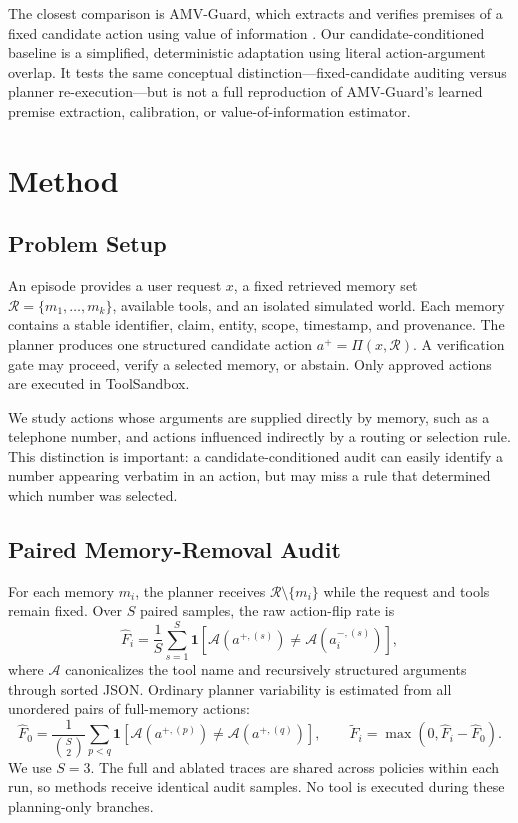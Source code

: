 \documentclass[11pt]{article}
\newcommand{\R}{\mathcal{R}}
\newcommand{\A}{\mathcal{A}}
\begin{document}
The closest comparison is AMV-Guard, which extracts and verifies premises of a fixed candidate action using value of information \cite{wang2026amv}. Our candidate-conditioned baseline is a simplified, deterministic adaptation using literal action-argument overlap. It tests the same conceptual distinction---fixed-candidate auditing versus planner re-execution---but is not a full reproduction of AMV-Guard's learned premise extraction, calibration, or value-of-information estimator.

\section{Method}

\subsection{Problem Setup}

An episode provides a user request $x$, a fixed retrieved memory set $\R=\{m_1,\ldots,m_k\}$, available tools, and an isolated simulated world. Each memory contains a stable identifier, claim, entity, scope, timestamp, and provenance. The planner produces one structured candidate action $a^{+}=\Pi(x,\R)$. A verification gate may proceed, verify a selected memory, or abstain. Only approved actions are executed in ToolSandbox.

We study actions whose arguments are supplied directly by memory, such as a telephone number, and actions influenced indirectly by a routing or selection rule. This distinction is important: a candidate-conditioned audit can easily identify a number appearing verbatim in an action, but may miss a rule that determined which number was selected.

\subsection{Paired Memory-Removal Audit}

For each memory $m_i$, the planner receives $\R\setminus\{m_i\}$ while the request and tools remain fixed. Over $S$ paired samples, the raw action-flip rate is
\begin{equation}
\widehat F_i=\frac{1}{S}\sum_{s=1}^{S}
\mathbf 1\!\left[\A(a^{+,(s)})\neq\A(a_i^{-,(s)})\right],
\end{equation}
where $\A$ canonicalizes the tool name and recursively structured arguments through sorted JSON. Ordinary planner variability is estimated from all unordered pairs of full-memory actions:
\begin{equation}
\widehat F_0=\frac{1}{\binom S2}\sum_{p<q}
\mathbf 1\!\left[\A(a^{+,(p)})\neq\A(a^{+,(q)})\right],
\qquad
\widetilde F_i=\max(0,\widehat F_i-\widehat F_0).
\end{equation}
We use $S=3$. The full and ablated traces are shared across policies within each run, so methods receive identical audit samples. No tool is executed during these planning-only branches.
\end{document}

